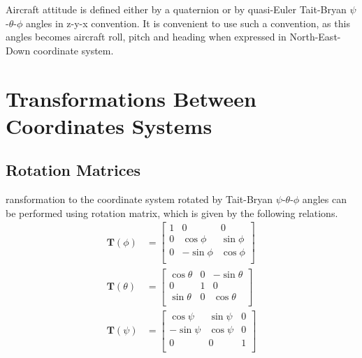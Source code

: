 Aircraft attitude is defined either by a quaternion or by quasi-Euler Tait-Bryan $\psi$\nobreakdash-$\theta$\nobreakdash-$\phi$ angles in z\nobreakdash-y\nobreakdash-x convention. It is convenient to use such a convention, as this angles becomes aircraft roll, pitch and heading when expressed in North\nobreakdash-East\nobreakdash-Down coordinate system.

\section{Transformations Between Coordinates Systems}

\subsection{Rotation Matrices}

ransformation to the coordinate system rotated by Tait-Bryan $\psi$\nobreakdash-$\theta$\nobreakdash-$\phi$ angles can be performed using rotation matrix, which is given by the following relations. \cite{Padfield2007, Sibilski2004}
\begin{align}
  \boldsymbol T \left( \phi \right) &=
  \left[
    \begin{matrix}
      1 &          0 &         0 \\
      0 &  \cos \phi & \sin \phi \\
      0 & -\sin \phi & \cos \phi \\
    \end{matrix}
  \right]
  \\
  \boldsymbol T \left( \theta \right) &=
  \left[
    \begin{matrix}
      \cos \theta & 0 & -\sin \theta \\
                0 & 1 &            0 \\
      \sin \theta & 0 &  \cos \theta \\
    \end{matrix}
  \right]
  \\
  \boldsymbol T \left( \psi \right) &=
  \left[
    \begin{matrix}
       \cos\psi & \sin\psi & 0 \\
      -\sin\psi & \cos\psi & 0 \\
              0 &        0 & 1 \\
    \end{matrix}
  \right]
\end{align}

